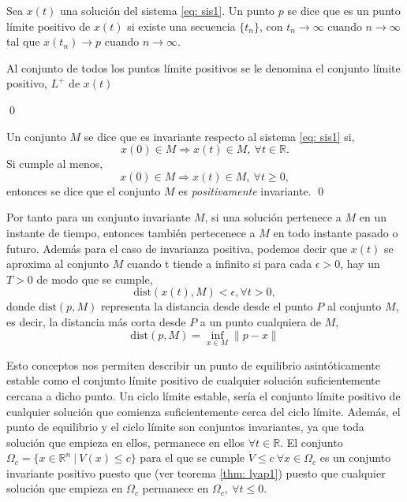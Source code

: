 \begin{definition}
Sea $x(t)$ una solución del sistema \ref{eq: sis1}. Un punto $p$ se dice que es un punto límite positivo de $x(t)$ si existe una secuencia $\{t_n\}$, con $t_n\to \infty$ cuando $n\to \infty$ tal que $x(t_n) \to p$ cuando $n \to \infty$.

Al conjunto de todos los puntos límite positivos se le denomina el conjunto límite positivo, $L^+$ de $x(t)$

\qed
\end{definition}

\begin{definition}
Un conjunto $M$ se dice que es invariante respecto al sistema \ref{eq: sis1}  si,
\begin{equation*}
x(0) 	\in M \Rightarrow x(t) \in M,\ \forall t \in \mathbb{R}.
\end{equation*}
Si cumple al menos,
\begin{equation*}
x(0) 	\in M \Rightarrow x(t) \in M,\ \forall t \geq 0,
\end{equation*}
entonces se dice que el conjunto $M$ es \emph{positivamente} invariante.
\qed
\end{definition}

Por tanto para un conjunto invariante $M$, si una solución pertenece a $M$ en un instante de tiempo, entonces también pertecenece a $M$ en todo instante pasado o futuro. Además para el caso de invarianza positiva, podemos decir que $x(t)$ se aproxima al conjunto $M$ cuando t tiende a infinito si para cada $\epsilon >0$,  hay un $T>0$ de modo que se cumple,
\begin{equation*}
\text{dist}(x(t),M)<\epsilon, \forall t>0,
\end{equation*} 
donde $\text{dist}(p,M)$ representa la distancia desde desde el punto $P$ al conjunto $M$, es decir, la distancia más corta desde $P$ a un punto cualquiera de $M$,
\begin{equation}
\text{dist}(p,M) = \inf_{x\in M}\|p-x\|
\end{equation} 

Esto conceptos nos permiten describir un punto de equilibrio asintóticamente estable como el conjunto límite positivo de cualquier solución suficientemente cercana a dicho punto. Un ciclo límite estable, sería el conjunto límite positivo de cualquier solución que comienza suficientemente cerca del ciclo límite. Además, el punto de equilibrio y el ciclo límite son conjuntos invariantes, ya que toda solución que empieza en ellos, permanece en ellos $\forall t \in \mathbb{R}$. El conjunto $\Omega_c =\{x \in \mathbb{R}^n\ |\ V(x)\leq c\}$ para el que se cumple $\dot V \leq c\ \forall x \in \Omega_c$ es un conjunto invariante positivo puesto que (ver teorema \ref{thm: lyap1}) puesto que cualquier solución que empieza en $\Omega_c$ permanece en $\Omega_c, \ \forall t \leq 0$.

